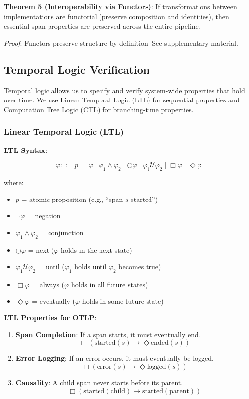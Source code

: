 \textbf{Theorem 5 (Interoperability via Functors)}:
If transformations between \otlp implementations are functorial (preserve composition and identities), then essential span properties are preserved across the entire pipeline.

\emph{Proof}: Functors preserve structure by definition. See supplementary material.

\subsection{Temporal Logic Verification}
\label{sec:temporal}

Temporal logic allows us to specify and verify system-wide properties that hold over time. We use Linear Temporal Logic (LTL) for sequential properties and Computation Tree Logic (CTL) for branching-time properties.

\subsubsection{Linear Temporal Logic (LTL)}

\textbf{LTL Syntax}:

\[
\varphi ::= p \mid \neg\varphi \mid \varphi_1 \land \varphi_2 \mid \bigcirc\varphi \mid \varphi_1 \mathcal{U} \varphi_2 \mid \Box\varphi \mid \Diamond\varphi
\]

where:
\begin{itemize}
\item $p$ = atomic proposition (e.g., ``span $s$ started'')
\item $\neg\varphi$ = negation
\item $\varphi_1 \land \varphi_2$ = conjunction
\item $\bigcirc\varphi$ = next ($\varphi$ holds in the next state)
\item $\varphi_1 \mathcal{U} \varphi_2$ = until ($\varphi_1$ holds until $\varphi_2$ becomes true)
\item $\Box\varphi$ = always ($\varphi$ holds in all future states)
\item $\Diamond\varphi$ = eventually ($\varphi$ holds in some future state)
\end{itemize}

\textbf{LTL Properties for OTLP}:

\begin{enumerate}
\item \textbf{Span Completion}: If a span starts, it must eventually end.
\[
\Box(\text{started}(s) \rightarrow \Diamond\text{ended}(s))
\]

\item \textbf{Error Logging}: If an error occurs, it must eventually be logged.
\[
\Box(\text{error}(s) \rightarrow \Diamond\text{logged}(s))
\]

\item \textbf{Causality}: A child span never starts before its parent.
\[
\Box(\text{started}(\text{child}) \rightarrow \text{started}(\text{parent}))
\]
\end{enumerate}

